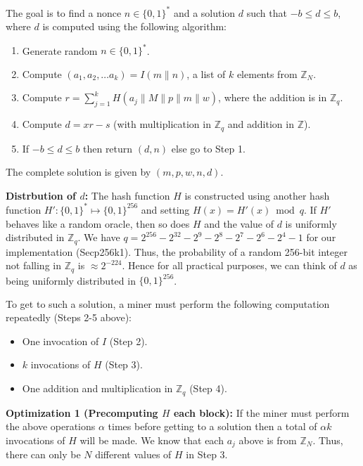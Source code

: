 \documentclass[11pt]{article}
\begin{document}
The goal is to find a nonce $n\in \{0,1\}^*$ and a solution $d$ such that $-b \leq d\leq b$, where $d$ is computed using the following algorithm:

\begin{enumerate}
	\item Generate random $n\in \{0,1\}^*$.
	\item Compute $(a_1, a_2, \ldots a_k) = I(m\|n)$,  
	a list of $k$ elements from $\mathbb{Z}_N$.
	\item Compute $r = \sum^{k}_{j=1} H(a_j\|M\|{p}\|m\|w)$, where the addition is in $\mathbb{Z}_q$.
	\item Compute $d = xr- {s}$ (with multiplication in $\mathbb{Z}_q$ and addition in $\mathbb{Z}$).
	\item If $-b \leq d \leq b$ then return $(d, n)$ else go to Step 1.
\end{enumerate}

The complete solution is given by $(m, {p}, w, n, d)$. 

\textbf{Distrbution of $d$:} The hash function $H$ is constructed using another hash function $H':\{0,1\}^*\mapsto\{0,1\}^{256}$ and setting $H(x)= H'(x) \bmod{q}$. If $H'$ behaves like a random oracle, then so does $H$ and the value of $d$ is uniformly distributed in $\mathbb{Z}_q$. 
We have $q = 2^{256} - 2^{32} - 2^{9} - 2^8 - 2^7 - 2^6 - 2^4 - 1$ for our implementation (Secp256k1). Thus, the probability of a random 256-bit integer not falling in $\mathbb{Z}_q$ is $\approx 2^{-224}$. Hence for all practical purposes, we can think of $d$ as being uniformly distributed in $\{0, 1\}^{256}$.


To get to such a solution, a miner must perform the following computation repeatedly (Steps 2-5 above):
\begin{itemize}
	\item One invocation of $I$ (Step 2).
	\item $k$ invocations of $H$ (Step 3).
	\item One addition and multiplication in $\mathbb{Z}_q$ (Step 4).
	
\end{itemize}


\textbf{Optimization 1 (Precomputing $H$ each block):} 
If the miner must perform the above operations $\alpha$ times before getting to a solution then a total of $\alpha k$ invocations of $H$ will be made. 
We know that each $a_j$ above is from $\mathbb{Z}_N$. Thus, there can only be $N$ different values of $H$ in Step 3. 
\end{document}
